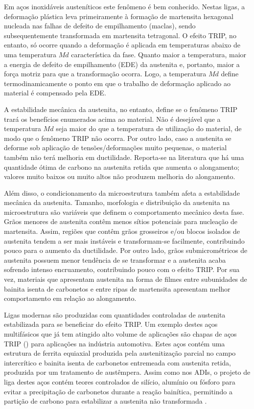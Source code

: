 Em aços inoxidáveis austeníticos este fenômeno é bem conhecido. %
Nestas ligas, a deformação plástica leva primeiramente à formação de martensita hexagonal nucleada nas falhas de defeito de empilhamento (maclas), sendo subsequentemente transformada em martensita tetragonal\cite{Honeycombe2006}. O efeito TRIP, no entanto, só ocorre quando a deformação é aplicada em temperaturas abaixo de uma temperatura $Md$ característica da fase. Quanto maior a temperatura, maior a energia de defeito de empilhamento (EDE) da austenita e, portanto, maior a força motriz para que a transformação ocorra. Logo, a temperatura $Md$ define termodinamicamente o ponto em que o trabalho de deformação aplicado ao material é compensado pela EDE\cite{DeCooman2004}.

A estabilidade mecânica da austenita, no entanto, define se o fenômeno TRIP trará os benefícios enumerados acima ao material. Não é desejável que a temperatura $Md$ seja maior do que a temperatura de utilização do material, de modo que o fenômeno TRIP não ocorra. Por outro lado, caso a austenita se deforme sob aplicação de tensões/deformações muito pequenas, o material também não terá melhoria em ductilidade. Reporta-se na literatura que há uma quantidade ótima de carbono na austenita retida que aumenta o alongamento; valores muito baixos ou muito altos não produzem melhoria do alongamento\cite{Reisner1997,Meyer1999}.

Além disso, o condicionamento da microestrutura também afeta a estabilidade mecânica da austenita. Tamanho, morfologia e distribuição da austenita na microestrutura são variáveis que definem o comportamento mecânico desta fase\cite{Timokhina2004}. Grãos menores de austenita contêm menos sítios potenciais para nucleação de martensita. Assim, regiões que contêm grãos grosseiros e/ou blocos isolados de austenita tendem a ser mais instáveis e transformam-se facilmente, contribuindo pouco para o aumento da ductilidade. Por outro lado, grãos submicrométricos de austenita possuem menor tendência de se transformar e a austenita acaba sofrendo intenso encruamento, contribuindo pouco com o efeito TRIP\cite{Bai1998}. Por sua vez, materiais que apresentam austenita na forma de filmes entre subunidades de bainita isenta de carbonetos e entre ripas de martensita apresentam melhor comportamento em relação ao alongamento\cite{Takahashi1991,Xiong2013}.

Ligas modernas são produzidas com quantidades controladas de austenita estabilizada para se beneficiar do efeito TRIP. Um exemplo destes aços multifásicos que já tem atingido alto volume de aplicações são chapas de aços TRIP () para aplicações na indústria automotiva. Estes aços contém uma estrutura de ferrita equiaxial produzida pela austenitização parcial no campo intercrítico e bainita isenta de carbonetos entremeada com austenita retida, produzida por um tratamento de austêmpera. Assim como nos ADIs, o projeto de liga destes aços contém teores controlados de silício, alumínio ou fósforo para evitar a precipitação de carbonetos durante a reação bainítica, permitindo a partição de carbono para estabilizar a austenita não transformada \cite{DeCooman2004,Honeycombe2006}.

